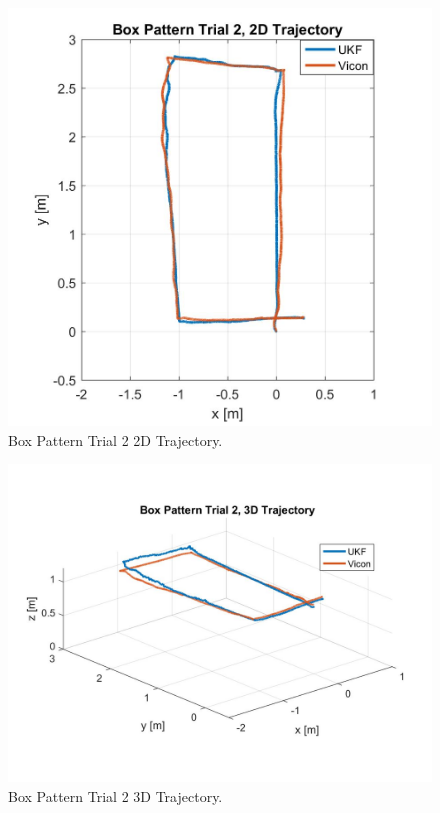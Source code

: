 \begin{figure}[p]
  \centering
    \includegraphics[height=0.6\textwidth]{box2_2d}
  \caption[Box Pattern Trial 2 2D Trajectory]{Box Pattern Trial 2 2D Trajectory.}
  \label{fig:box2_2d}
\end{figure}
\begin{figure}[p]
  \centering
    \includegraphics[height=0.7\textwidth]{box2_3d}
  \caption[Box Pattern Trial 2 3D Trajectory]{Box Pattern Trial 2 3D Trajectory.}
  \label{fig:box2_3d}
\end{figure}
\clearpage

